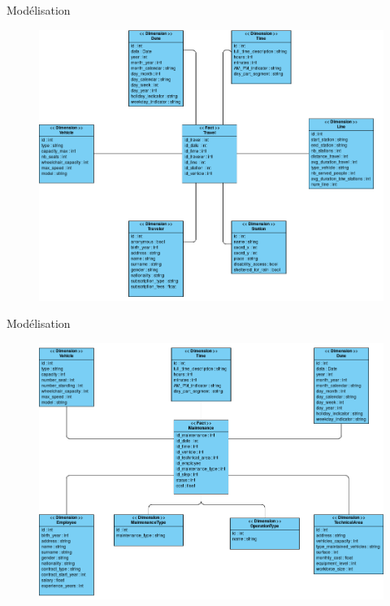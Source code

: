 \documentclass[a4paper,12pt,usenames,dvipsnames]{beamer}
\begin{document}
\begin{frame}{Modélisation}
\begin{figure}[!ht]
  \centering
  \includegraphics[scale=0.27]{images/voyages_datamart.png}
\end{figure}
\end{frame}

\begin{frame}{Modélisation}
\begin{figure}[!ht]
  \centering
  \includegraphics[scale=0.27]{images/maintenance_datamart.png}
\end{figure}
\end{frame}
\end{document}
